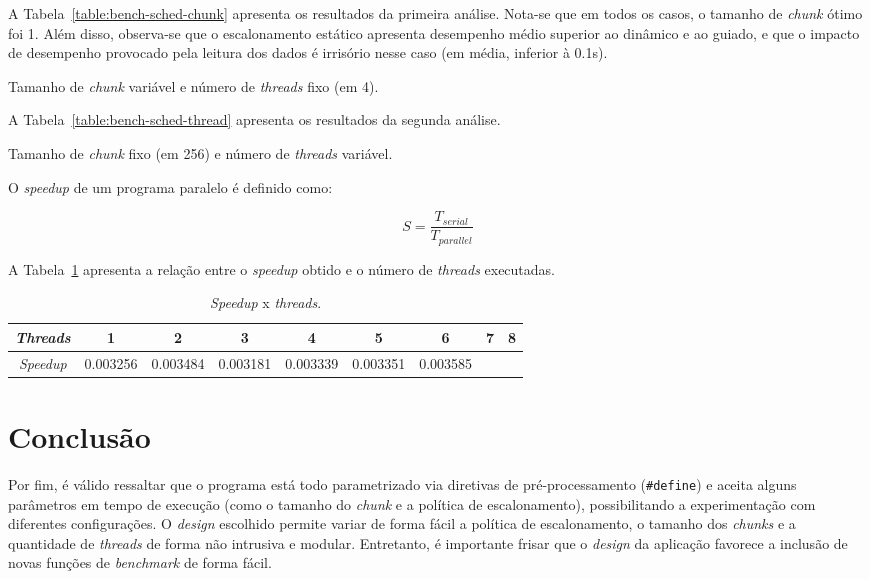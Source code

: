 \documentclass[12pt,a4paper]{article}
\begin{document}
A Tabela~\ref{table:bench-sched-chunk} apresenta os resultados da primeira
análise. Nota-se que em todos os casos, o tamanho de \textit{chunk} ótimo foi 1.
Além disso, observa-se que o escalonamento estático apresenta desempenho médio
superior ao dinâmico e ao guiado, e que o impacto de desempenho provocado pela
leitura dos dados é irrisório nesse caso (em média, inferior à 0.1s).

\begin{table}[h!]
\label{table:bench-sched-chunk}
\footnotesize
\centering
\caption{Tamanho de \textit{chunk} variável e número de \textit{threads} fixo
(em 4).}

\end{table}

A Tabela~\ref{table:bench-sched-thread} apresenta os resultados da segunda
análise. 

\begin{table}[h!]
\label{table:bench-sched-thread}
\footnotesize
\centering
\caption{Tamanho de \textit{chunk} fixo (em 256) e número de \textit{threads}
variável.}

\end{table}

O \textit{speedup} de um programa paralelo é definido como:

$$S = \frac{T_{serial}}{T_{parallel}}$$

A Tabela~\ref{table:speedup} apresenta a relação entre o
\textit{speedup} obtido e o número de \textit{threads} executadas.

\begin{table}[h!]
\label{table:speedup}
\footnotesize
\centering
\caption{\textit{Speedup} x \textit{threads}.}
\begin{tabular}{@{}ccccccccc@{}}
\toprule
\textit{Threads} & 1 & 2 & 3 & 4 & 5 & 6 & 7 & 8 \\ \midrule
\textit{Speedup} & 0.003256 & 0.003484 & 0.003181 & 0.003339 & 0.003351 & 0.003585 \\ \bottomrule 
\end{tabular}

\end{table}


\section{Conclusão}
Por fim, é válido ressaltar que o programa está todo parametrizado via diretivas
de pré-processamento (\texttt{\#define}) e aceita alguns parâmetros em tempo de
execução (como o tamanho do \textit{chunk} e a política de escalonamento),
possibilitando a experimentação com diferentes configurações. O \textit{design}
escolhido permite variar de forma fácil a política de escalonamento, o tamanho
dos \textit{chunks} e a quantidade de \textit{threads} de forma não intrusiva e
modular.
Entretanto, é importante frisar que o \textit{design}
da aplicação favorece a inclusão de novas funções de \textit{benchmark} de forma
fácil.
\end{document}
